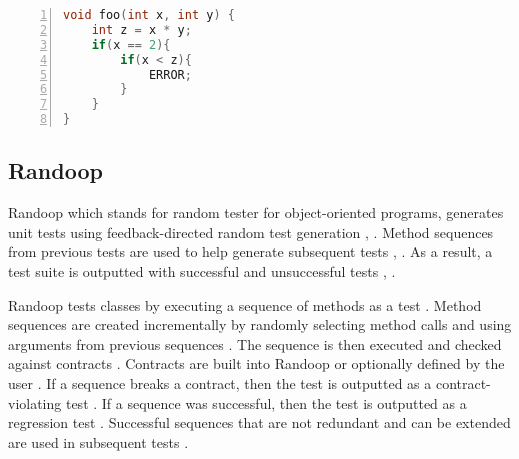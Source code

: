 
\begin{lstlisting}[language=C, tabsize=3, numbers=left,
label={lst:cuteExample}, caption={Example C program}, captionpos=b,
frame=single]
void foo(int x, int y) {
	int z = x * y;
	if(x == 2){
		if(x < z){
			ERROR;
		}
	}
}
\end{lstlisting}

\subsection{Randoop}
Randoop which stands for random tester for object-oriented programs, generates unit tests using feedback-directed random test generation \cite{randoopAll}, \cite{randoopJava}. Method sequences from previous tests are used to help generate subsequent tests \cite{randoopAll}, \cite{randoopJava}.
As a result, a test suite is outputted with successful and unsuccessful tests \cite{randoopAll}, \cite{randoopJava}.

Randoop tests classes by executing a sequence of methods as a test \cite{randoopJava}. Method sequences are created incrementally by randomly selecting method calls and using arguments from previous sequences \cite{randoopJava}.
The sequence is then executed and checked against contracts \cite{randoopAll}.
Contracts are built into Randoop or optionally defined by the user \cite{randoopAll}.
If a sequence breaks a contract, then the test is outputted as a contract-violating test \cite{randoopAll}. If a sequence was successful, then the test is outputted as a regression test \cite{randoopAll}.
Successful sequences that are not redundant and can be extended are used in subsequent tests \cite{randoopAll}.


